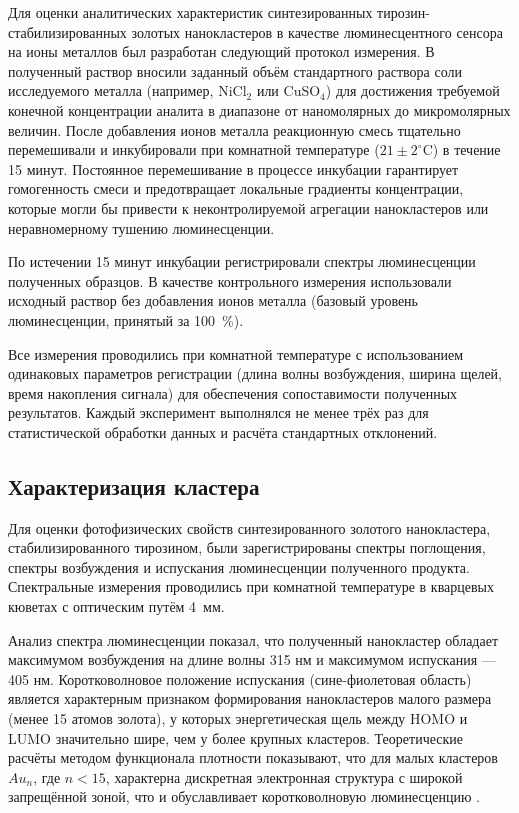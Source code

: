 \documentclass[a4paper, 12pt]{article}
\begin{document}
\begin{onehalfspace}
	Для оценки аналитических характеристик синтезированных тирозин-стабилизированных золотых нанокластеров в качестве люминесцентного сенсора на ионы металлов был разработан следующий протокол измерения.
	В полученный раствор вносили заданный объём стандартного раствора соли исследуемого металла (например, $\text{NiCl}_2$ или $\text{CuSO}_4$) для достижения требуемой конечной концентрации аналита в диапазоне от наномолярных до микромолярных величин. После добавления ионов металла реакционную смесь тщательно перемешивали и инкубировали при комнатной температуре ($21\pm2^\circ \text{C}$) в течение 15 минут. Постоянное перемешивание в процессе инкубации гарантирует гомогенность смеси и предотвращает локальные градиенты концентрации, которые могли бы привести к неконтролируемой агрегации нанокластеров или неравномерному тушению люминесценции.

	По истечении 15 минут инкубации регистрировали спектры люминесценции полученных образцов. В качестве контрольного измерения использовали исходный раствор без добавления ионов металла (базовый уровень люминесценции, принятый за 100~\%).

	Все измерения проводились при комнатной температуре с использованием одинаковых параметров регистрации (длина волны возбуждения, ширина щелей, время накопления сигнала) для обеспечения сопоставимости полученных результатов. Каждый эксперимент выполнялся не менее трёх раз для статистической обработки данных и расчёта стандартных отклонений.


\subsection*{Характеризация кластера}

	Для оценки фотофизических свойств синтезированного золотого нанокластера, стабилизированного тирозином, были зарегистрированы спектры поглощения, спектры возбуждения и испускания люминесценции полученного продукта. Спектральные измерения проводились при комнатной температуре в кварцевых кюветах с оптическим путём 4~мм.

	Анализ спектра люминесценции показал, что полученный нанокластер обладает максимумом возбуждения на длине волны 315 нм и максимумом испускания — 405 нм. Коротковолновое положение испускания (сине-фиолетовая область) является характерным признаком формирования нанокластеров малого размера (менее 15 атомов золота), у которых энергетическая щель между HOMO и LUMO значительно шире, чем у более крупных кластеров.
	Теоретические расчёты методом функционала плотности показывают, что для малых кластеров $Au_n$, где $n<15$, характерна дискретная электронная структура с широкой запрещённой зоной, что и обуславливает коротковолновую люминесценцию \cite{Rasulev2012StructuresAS}.


\end{onehalfspace}
\end{document}
